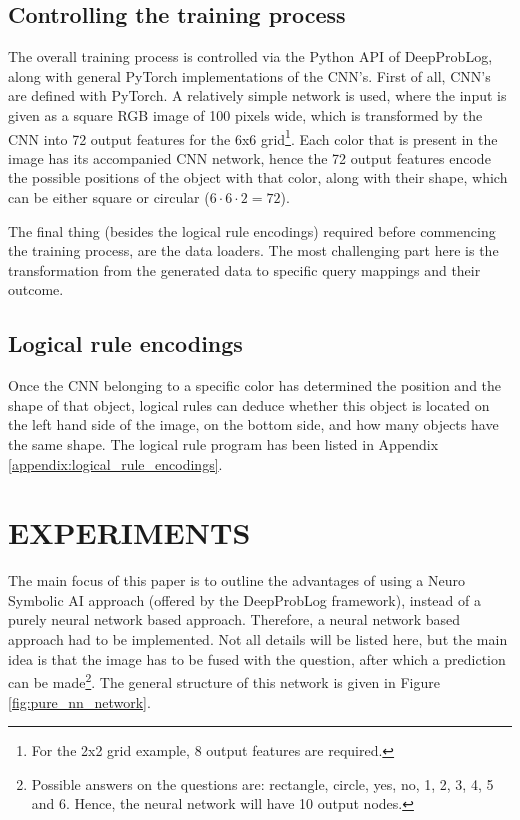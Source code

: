 \documentclass[english]{sobraep}
\begin{document}
\subsection{Controlling the training process}
The overall training process is controlled via the Python API of DeepProbLog, along with general PyTorch implementations of the CNN's.
First of all, CNN's are defined with PyTorch. A relatively simple network is used, where the input is given as a square RGB image of 100 pixels wide, which is transformed by the CNN into 72 output features for the 6x6 grid\footnote{For the 2x2 grid example, 8 output features are required.}. Each color that is present in the image has its accompanied CNN network, hence the 72 output features encode the possible positions of the object with that color, along with their shape, which can be either square or circular ($6 \cdot 6 \cdot 2 = 72$).

The final thing (besides the logical rule encodings) required before commencing the training process, are the data loaders. The most challenging part here is the transformation from the generated data to specific query mappings and their outcome. 

\subsection{Logical rule encodings}
Once the CNN belonging to a specific color has determined the position and the shape of that object, logical rules can deduce whether this object is located on the left hand side of the image, on the bottom side, and how many objects have the same shape. The logical rule program has been listed in Appendix \ref{appendix:logical_rule_encodings}.

\section{EXPERIMENTS}
\label{sec:experiments}
The main focus of this paper is to outline the advantages of using a Neuro Symbolic AI approach (offered by the DeepProbLog framework), instead of a purely neural network based approach. Therefore, a neural network based approach had to be implemented. Not all details will be listed here, but the main idea is that the image has to be fused with the question, after which a prediction can be made\footnote{Possible answers on the questions are: rectangle, circle, yes, no, 1, 2, 3, 4, 5 and 6. Hence, the neural network will have 10 output nodes.}. The general structure of this network is given in Figure \ref{fig:pure_nn_network}.
\end{document}
